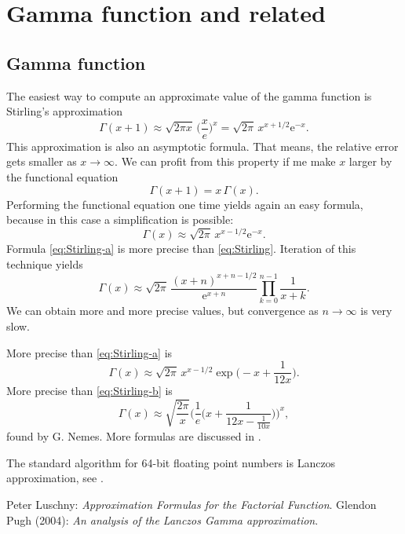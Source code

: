 \documentclass[a4paper,10pt,fleqn]{scrartcl}
\newcommand{\ee}{\mathrm e}
\begin{document}
\section{Gamma function and related}
\subsection{Gamma function}

The easiest way to compute an approximate value of the gamma function
is Stirling's approximation
\begin{equation}\label{eq:Stirling}
\Gamma(x+1) \approx \sqrt{2\pi x}\,\bigg(\frac{x}{e}\bigg)^x
= \sqrt{2\pi}\,x^{x+1/2}\ee^{-x}.
\end{equation}
This approximation is also an asymptotic formula. That means, the
relative error gets smaller as $x\to\infty$. We can profit from
this property if me make $x$ larger by the functional equation
\begin{equation}
\Gamma(x+1) = x\,\Gamma(x).
\end{equation}
Performing the functional equation one time yields again an easy
formula, because in this case a simplification is possible:
\begin{equation}\label{eq:Stirling-a}
\Gamma(x) \approx \sqrt{2\pi}\,x^{x-1/2}\ee^{-x}.
\end{equation}
Formula \eqref{eq:Stirling-a} is more
precise than \eqref{eq:Stirling}. Iteration of this technique yields
\begin{equation}
\Gamma(x) \approx \sqrt{2\pi}\,\frac{(x+n)^{x+n-1/2}}{\ee^{x+n}}
\prod_{k=0}^{n-1} \frac{1}{x+k}.
\end{equation}
We can obtain more and more precise values, but convergence
as $n\to\infty$ is very slow.

More precise than \eqref{eq:Stirling-a} is
\begin{equation}\label{eq:Stirling-b}
\Gamma(x) \approx \sqrt{2\pi}\,x^{x-1/2}\exp\bigg(-x+\frac{1}{12x}\bigg).
\end{equation}
More precise than \eqref{eq:Stirling-b} is
\begin{equation}\label{eq:Nemes}
\Gamma(x) \approx \sqrt{\frac{2\pi}{x} }
\bigg(\frac{1}{e} \bigg(x + \frac{1}{12x - \frac{1}{10x}}\bigg)\bigg)^x,
\end{equation}
found by G. Nemes. More formulas are discussed in \cite{Luschny}.

The standard algorithm for 64-bit floating point numbers is
Lanczos approximation, see \cite{Pugh}.

\begin{thebibliography}{x}
Peter Luschny: \emph{Approximation Formulas for the Factorial Function}.
Glendon Pugh (2004): \emph{An analysis of the Lanczos Gamma approximation}.
\end{thebibliography}
\end{document}
